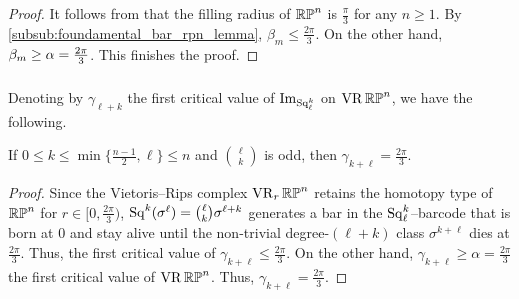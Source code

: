 \begin{proof}%
	It follows from \cite{katz1983filling} that the filling radius of $\mathbb{RP}^n$ is $\frac{\pi}{3}$ for any $n \geq 1$.
	By \cref{subsub:foundamental_bar_rpn_lemma}, $\beta_m\leq \tfrac{2\pi}{3}$.
    On the other hand, $\beta_m\geq \alpha = \tfrac{2\pi}{3}$.
    This finishes the proof.
\end{proof}

\subsubsection{}\label{subsub:gamma_rpn}

Denoting by \(\gamma_{\ell+k}\) the first critical value of \(\operatorname{Im}_{\operatorname{Sq}^k_\ell}\) on \(\operatorname{VR}\mathbb{RP}^n\), we have the following.

\medskip\proposition
If $0 \leq k \leq \min\{\frac{n-1}{2}, \ell\} \leq n$ and $\binom{\ell}{k}$ is odd, then $\gamma_{k+\ell} = \tfrac{2\pi}{3}$.

\begin{proof}
	Since the Vietoris--Rips complex $\operatorname{VR}_r\mathbb{RP}^n$ retains the homotopy type of $\mathbb{RP}^n$ for $r \in [0,\tfrac{2\pi}{3})$, $\operatorname{Sq}^k(\sigma^\ell) = \binom{\ell}{k}\sigma^{\ell+k}$ generates a bar in the $\operatorname{Sq}^k_\ell$--barcode that is born at $0$ and stay alive until the non-trivial degree-$(\ell+k)$ class $\sigma^{k+\ell}$ dies at $\tfrac{2\pi}{3}$.
	Thus, the first critical value of $\gamma_{k+\ell} \leq \tfrac{2\pi}{3}$.
	On the other hand, $\gamma_{k+\ell} \geq \alpha = \tfrac{2\pi}{3}$ the first critical value of $\operatorname{VR}\mathbb{RP}^n$.
	Thus, $\gamma_{k+\ell} = \tfrac{2\pi}{3}$.
\end{proof}
